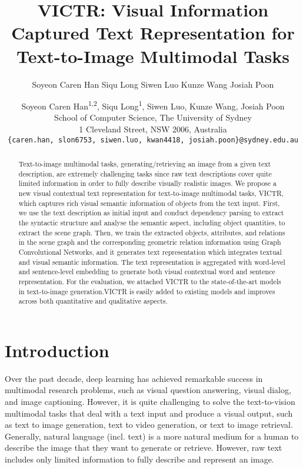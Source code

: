 \documentclass[11pt]{article}
\title{VICTR: Visual Information Captured Text Representation for Text-to-Image Multimodal Tasks}
\author{Soyeon Caren Han \And
 Siqu Long \And
  Siwen Luo \And
  Kunze Wang \And
  Josiah Poon 
}
\author{Soyeon Caren Han\textsuperscript{1,2}, Siqu Long\textsuperscript{1}, Siwen Luo, Kunze Wang, Josiah Poon \\
  School of Computer Science, The University of Sydney \\
  1 Cleveland Street, NSW 2006, Australia \\
  {\tt \{caren.han, slon6753, siwen.luo, kwan4418, josiah.poon\}@sydney.edu.au}\\    }
\date{}
\begin{document}
\maketitle
\begin{abstract}
Text-to-image multimodal tasks, generating/retrieving an image from a given text description, are extremely challenging tasks since raw text descriptions cover quite limited information in order to fully describe visually realistic images. We propose a new visual contextual text representation for text-to-image multimodal tasks, VICTR, which captures rich visual semantic information of objects from the text input. First, we use the text description as initial input and conduct dependency parsing to extract the syntactic structure and analyse the semantic aspect, including object quantities, to extract the scene graph. Then, we train the extracted objects, attributes, and relations in the scene graph and the corresponding geometric relation information using Graph Convolutional Networks, and it generates text representation which integrates textual and visual semantic information. The text representation is aggregated with word-level and sentence-level embedding to generate both visual contextual word and sentence representation. For the evaluation, we attached VICTR to the state-of-the-art models in text-to-image generation.VICTR is easily added to existing models and improves across both quantitative and qualitative aspects.
\end{abstract}

\section{Introduction}

Over the past decade, deep learning has achieved remarkable success in multimodal research problems, such as visual question answering, visual dialog, and image captioning. However, it is quite challenging to solve the text-to-vision multimodal tasks that deal with a text input and produce a visual output, such as text to image generation, text to video generation, or text to image retrieval. Generally, natural language (incl. text) is a more natural medium for a human to describe the image that they want to generate or retrieve. However, raw text includes only limited information to fully describe and represent an image.
\end{document}
